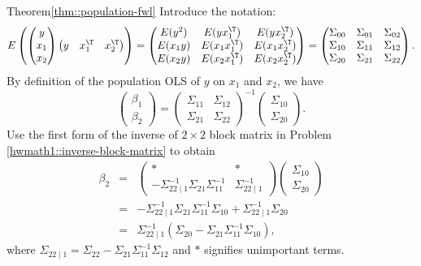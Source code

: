 \begin{myproof}{Theorem}{\ref{thm::population-fwl}}
Introduce the notation:
$$
E\left( 
\begin{pmatrix}
y\\
x_1\\
x_2
\end{pmatrix}
\begin{pmatrix}
y & x_1^{\T} & x_2^{\T}
\end{pmatrix}
\right) 
= \begin{pmatrix}
E(y^2) & E(y x_1^{\T}) & E(y x_2^{\T}) \\
E(x_1 y) & E(x_1 x_1^{\T}) & E(x_1 x_2^{\T}) \\
E(x_2 y) & E(x_2 x_1^{\T}) & E(x_2 x_2^{\T}) \\
\end{pmatrix}
= \begin{pmatrix}
\Sigma_{00} & \Sigma_{01} & \Sigma_{02} \\
\Sigma_{10} & \Sigma_{11} & \Sigma_{12} \\
\Sigma_{20} & \Sigma_{21} & \Sigma_{22}
\end{pmatrix}.
$$
By definition of the population OLS of $y$ on $x_1$ and $x_2$, we have
$$
\begin{pmatrix}
\beta_1 \\
\beta_2
\end{pmatrix}
= \begin{pmatrix}
\Sigma_{11} & \Sigma_{12} \\
\Sigma_{21} & \Sigma_{22}
\end{pmatrix}^{-1} 
\begin{pmatrix}
\Sigma_{10} \\
\Sigma_{20}
\end{pmatrix}.
$$
Use the first form of the inverse of $2\times 2$ block matrix in Problem \ref{hwmath1::inverse-block-matrix} to obtain
\begin{eqnarray*}
\beta_2 
&=& \begin{pmatrix}
* & *\\
- \Sigma_{22\mid 1}^{-1} \Sigma_{21}  \Sigma_{11}^{-1} & \Sigma_{22\mid 1}^{-1}
\end{pmatrix}
\begin{pmatrix}
\Sigma_{10} \\
\Sigma_{20}
\end{pmatrix} \\
&=& - \Sigma_{22\mid 1}^{-1} \Sigma_{21}  \Sigma_{11}^{-1}  \Sigma_{10} 
+ \Sigma_{22\mid 1}^{-1}\Sigma_{20} \\
&=& \Sigma_{22\mid 1}^{-1} (\Sigma_{20}- \Sigma_{21}  \Sigma_{11}^{-1}  \Sigma_{10} ) , 
\end{eqnarray*}
where $\Sigma_{22\mid 1} = \Sigma_{22} -\Sigma_{21} \Sigma_{11}^{-1} \Sigma_{12} $ and $*$ signifies unimportant terms.




\end{myproof}
